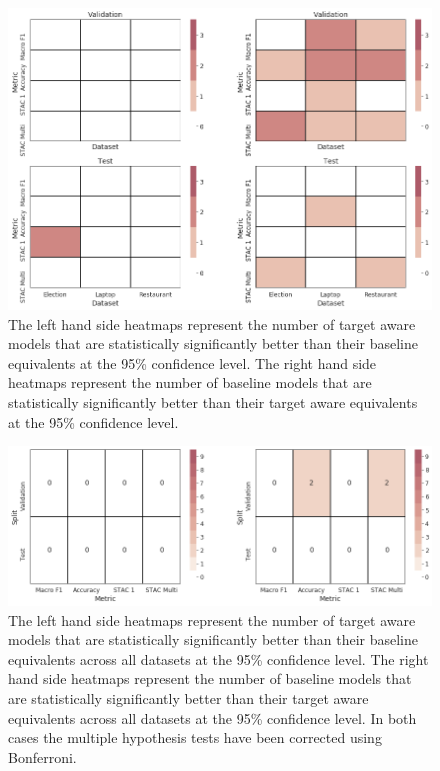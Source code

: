 \begin{figure}[!h]
    \centering
    \includegraphics[scale=0.5]{images/augmentation/methods_performance/Inter_Target/dataset_sig_scores_inter_target.png}
    \caption{The left hand side heatmaps represent the number of target aware models that are statistically significantly better than their baseline equivalents at the 95\% confidence level. The right hand side heatmaps represent the number of baseline models that are statistically significantly better than their target aware equivalents at the 95\% confidence level.}
    \label{fig:aug_dataset_sig_scores_inter_target}
\end{figure}
\begin{figure}[!h]
    \centering
    \includegraphics[scale=0.5]{images/augmentation/methods_performance/Inter_Target/combined_sig_scores_inter_target.png}
    \caption{The left hand side heatmaps represent the number of target aware models that are statistically significantly better than their baseline equivalents across all datasets at the 95\% confidence level. The right hand side heatmaps represent the number of baseline models that are statistically significantly better than their target aware equivalents across all datasets at the 95\% confidence level. In both cases the multiple hypothesis tests have been corrected using Bonferroni.}
    \label{fig:aug_combined_sig_scores_inter_target}
\end{figure}

